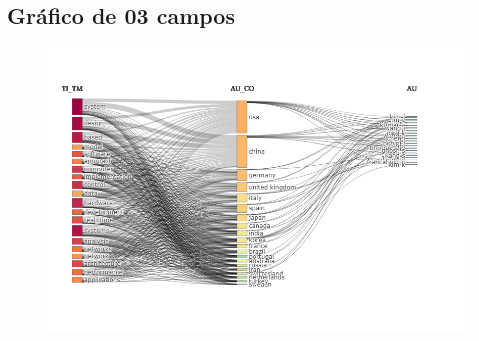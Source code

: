 \subsection{Gráfico de 03 campos}

\begin{figure}
    \centering
    \includegraphics[width=12cm]{experiments/GMalme/AnaliseBibliometrica/ImpactoDeJogosNaTecnologia/Figs/Three-Fields Plot.png}
    \caption{}
    \label{fig:AIJ_grafTres}
\end{figure}